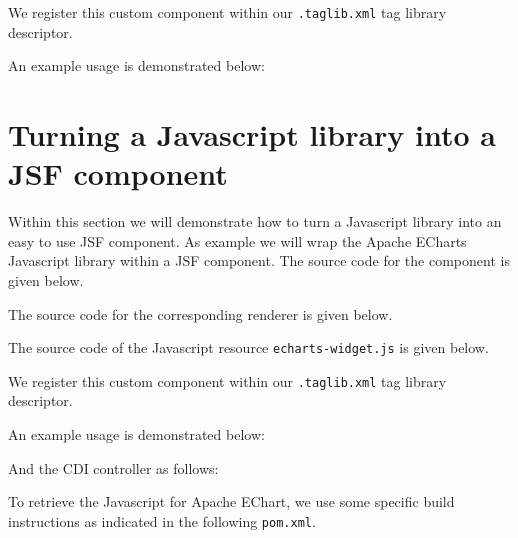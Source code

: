 We register this custom component within our \texttt{.taglib.xml} tag library descriptor.


An example usage is demonstrated below:


\section{Turning a Javascript library into a JSF component}
Within this section we will demonstrate how to turn a Javascript library into an easy to use JSF component.
As example we will wrap the Apache ECharts \cite{ECharts} Javascript library within a JSF component.
The source code for the component is given below.


The source code for the corresponding renderer is given below.


The source code of the Javascript resource \texttt{echarts-widget.js} is given below.


We register this custom component within our \texttt{.taglib.xml} tag library descriptor.


An example usage is demonstrated below:


And the CDI controller as follows:


To retrieve the Javascript for Apache EChart, we use some specific build instructions as indicated in the following \texttt{pom.xml}.
